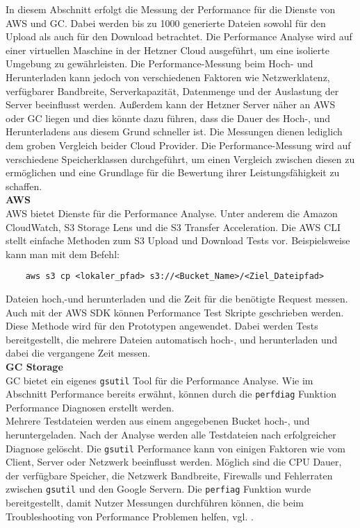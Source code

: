 In diesem Abschnitt erfolgt die Messung der Performance für die Dienste von AWS und GC. Dabei werden bis zu 1000 generierte Dateien sowohl für den Upload als auch für den Download betrachtet. Die Performance Analyse wird auf einer virtuellen Maschine in der Hetzner Cloud ausgeführt, um eine isolierte Umgebung zu gewährleisten. Die Performance-Messung beim Hoch- und Herunterladen kann jedoch von verschiedenen Faktoren wie Netzwerklatenz, verfügbarer Bandbreite, Serverkapazität, Datenmenge und der Auslastung der Server beeinflusst werden. Außerdem kann der Hetzner Server näher an AWS oder GC liegen und dies könnte dazu führen, dass die Dauer des Hoch-, und Herunterladens aus diesem Grund schneller ist. Die Messungen dienen lediglich dem groben Vergleich beider Cloud Provider. Die Performance-Messung wird auf verschiedene Speicherklassen durchgeführt, um einen Vergleich zwischen diesen zu ermöglichen und eine Grundlage für die Bewertung ihrer Leistungsfähigkeit zu schaffen.\\

\textbf{AWS}\\

AWS bietet Dienste für die Performance Analyse. Unter anderem die Amazon CloudWatch, S3 Storage Lens und die S3 Transfer Acceleration. Die AWS CLI stellt einfache Methoden zum S3 Upload und Download Tests vor. Beispielsweise kann man mit dem Befehl:

\begin{lstlisting}
	aws s3 cp <lokaler_pfad> s3://<Bucket_Name>/<Ziel_Dateipfad>
\end{lstlisting}

Dateien hoch,-und herunterladen und die Zeit für die benötigte Request messen. Auch mit der AWS SDK können Performance Test Skripte geschrieben werden. Diese Methode wird für den Prototypen angewendet. Dabei werden Tests bereitgestellt, die mehrere Dateien automatisch hoch-, und herunterladen und dabei die vergangene Zeit messen.\\ 

\textbf{GC Storage}\\

GC bietet ein eigenes \verb|gsutil| Tool für die Performance Analyse. Wie im Abschnitt Performance bereits erwähnt, können durch die \verb|perfdiag| Funktion Performance Diagnosen erstellt werden.\\ 

Mehrere Testdateien werden aus einem angegebenen Bucket hoch-, und heruntergeladen. Nach der Analyse werden alle Testdateien nach erfolgreicher Diagnose gelöscht. Die \verb|gsutil| Performance kann von einigen Faktoren wie vom Client, Server oder Netzwerk beeinflusst werden. Möglich sind die CPU Dauer, der verfügbare Speicher, die Netzwerk Bandbreite, Firewalls und Fehlerraten zwischen \verb|gsutil| und den Google Servern. Die \verb|perfiag| Funktion wurde bereitgestellt, damit Nutzer Messungen durchführen können, die beim Troubleshooting von Performance Problemen helfen, vgl. \cite{gc-perfdiag}.\\

